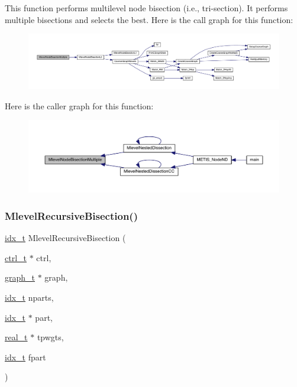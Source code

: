 This function performs multilevel node bisection (i.\+e., tri-\/section). It performs multiple bisections and selects the best. Here is the call graph for this function\+:\nopagebreak
\begin{figure}[H]
\begin{center}
\leavevmode
\includegraphics[width=350pt]{a00945_a59c8030c5429e219a8535c2a11cef724_cgraph}
\end{center}
\end{figure}
Here is the caller graph for this function\+:\nopagebreak
\begin{figure}[H]
\begin{center}
\leavevmode
\includegraphics[width=350pt]{a00945_a59c8030c5429e219a8535c2a11cef724_icgraph}
\end{center}
\end{figure}
\mbox{\label{a00945_a5510f276b321a8450b2e9cc913c2f00f}} 
\subsubsection{\texorpdfstring{Mlevel\+Recursive\+Bisection()}{MlevelRecursiveBisection()}}
{\footnotesize\ttfamily \hyperlink{a00876_aaa5262be3e700770163401acb0150f52}{idx\+\_\+t} Mlevel\+Recursive\+Bisection (\begin{DoxyParamCaption}\item[{\hyperlink{a00742}{ctrl\+\_\+t} $\ast$}]{ctrl,  }\item[{\hyperlink{a00734}{graph\+\_\+t} $\ast$}]{graph,  }\item[{\hyperlink{a00876_aaa5262be3e700770163401acb0150f52}{idx\+\_\+t}}]{nparts,  }\item[{\hyperlink{a00876_aaa5262be3e700770163401acb0150f52}{idx\+\_\+t} $\ast$}]{part,  }\item[{\hyperlink{a00876_a1924a4f6907cc3833213aba1f07fcbe9}{real\+\_\+t} $\ast$}]{tpwgts,  }\item[{\hyperlink{a00876_aaa5262be3e700770163401acb0150f52}{idx\+\_\+t}}]{fpart }\end{DoxyParamCaption})}

